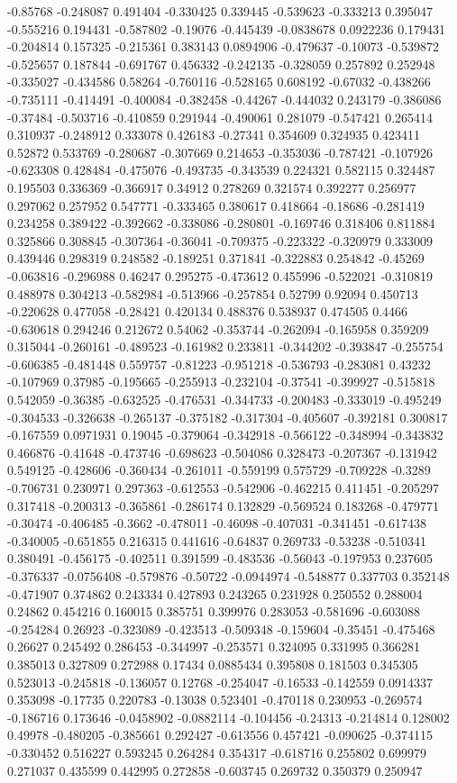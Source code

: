 -0.85768 -0.248087 0.491404 -0.330425 0.339445 -0.539623 -0.333213 0.395047 -0.555216 0.194431 -0.587802 -0.19076 -0.445439 -0.0838678 0.0922236 0.179431 -0.204814 0.157325 -0.215361 0.383143 0.0894906 -0.479637 -0.10073 -0.539872 -0.525657 0.187844 -0.691767 0.456332 -0.242135 -0.328059 0.257892 0.252948 -0.335027 -0.434586 0.58264 -0.760116 -0.528165 0.608192 -0.67032 -0.438266 -0.735111 -0.414491 -0.400084 -0.382458 -0.44267 -0.444032 0.243179 -0.386086 -0.37484 -0.503716 -0.410859 0.291944 -0.490061 0.281079 -0.547421 0.265414 0.310937 -0.248912 0.333078 0.426183 -0.27341 0.354609 0.324935 0.423411 0.52872 0.533769 -0.280687 -0.307669 0.214653 -0.353036 -0.787421 -0.107926 -0.623308 0.428484 -0.475076 -0.493735 -0.343539 0.224321 0.582115 0.324487 0.195503 0.336369 -0.366917 0.34912 0.278269 0.321574 0.392277 0.256977 0.297062 0.257952 0.547771 -0.333465 0.380617 0.418664 -0.18686 -0.281419 0.234258 0.389422 -0.392662 -0.338086 -0.280801 -0.169746 0.318406 0.811884 0.325866 0.308845 -0.307364 -0.36041 -0.709375 -0.223322 -0.320979 0.333009 0.439446 0.298319 0.248582 -0.189251 0.371841 -0.322883 0.254842 -0.45269 -0.063816 -0.296988 0.46247 0.295275 -0.473612 0.455996 -0.522021 -0.310819 0.488978 0.304213 -0.582984 -0.513966 -0.257854 0.52799 0.92094 0.450713 -0.220628 0.477058 -0.28421 0.420134 0.488376 0.538937 0.474505 0.4466 -0.630618 0.294246 0.212672 0.54062 -0.353744 -0.262094 -0.165958 0.359209 0.315044 -0.260161 -0.489523 -0.161982 0.233811 -0.344202 -0.393847 -0.255754 -0.606385 -0.481448 0.559757 -0.81223 -0.951218 -0.536793 -0.283081 0.43232 -0.107969 0.37985 -0.195665 -0.255913 -0.232104 -0.37541 -0.399927 -0.515818 0.542059 -0.36385 -0.632525 -0.476531 -0.344733 -0.200483 -0.333019 -0.495249 -0.304533 -0.326638 -0.265137 -0.375182 -0.317304 -0.405607 -0.392181 0.300817 -0.167559 0.0971931 0.19045 -0.379064 -0.342918 -0.566122 -0.348994 -0.343832 0.466876 -0.41648 -0.473746 -0.698623 -0.504086 0.328473 -0.207367 -0.131942 0.549125 -0.428606 -0.360434 -0.261011 -0.559199 0.575729 -0.709228 -0.3289 -0.706731 0.230971 0.297363 -0.612553 -0.542906 -0.462215 0.411451 -0.205297 0.317418 -0.200313 -0.365861 -0.286174 0.132829 -0.569524 0.183268 -0.479771 -0.30474 -0.406485 -0.3662 -0.478011 -0.46098 -0.407031 -0.341451 -0.617438 -0.340005 -0.651855 0.216315 0.441616 -0.64837 0.269733 -0.53238 -0.510341 0.380491 -0.456175 -0.402511 0.391599 -0.483536 -0.56043 -0.197953 0.237605 -0.376337 -0.0756408 -0.579876 -0.50722 -0.0944974 -0.548877 0.337703 0.352148 -0.471907 0.374862 0.243334 0.427893 0.243265 0.231928 0.250552 0.288004 0.24862 0.454216 0.160015 0.385751 0.399976 0.283053 -0.581696 -0.603088 -0.254284 0.26923 -0.323089 -0.423513 -0.509348 -0.159604 -0.35451 -0.475468 0.26627 0.245492 0.286453 -0.344997 -0.253571 0.324095 0.331995 0.366281 0.385013 0.327809 0.272988 0.17434 0.0885434 0.395808 0.181503 0.345305 0.523013 -0.245818 -0.136057 0.12768 -0.254047 -0.16533 -0.142559 0.0914337 0.353098 -0.17735 0.220783 -0.13038 0.523401 -0.470118 0.230953 -0.269574 -0.186716 0.173646 -0.0458902 -0.0882114 -0.104456 -0.24313 -0.214814 0.128002 0.49978 -0.480205 -0.385661 0.292427 -0.613556 0.457421 -0.090625 -0.374115 -0.330452 0.516227 0.593245 0.264284 0.354317 -0.618716 0.255802 0.699979 0.271037 0.435599 0.442995 0.272858 -0.603745 0.269732 0.350379 0.250947 